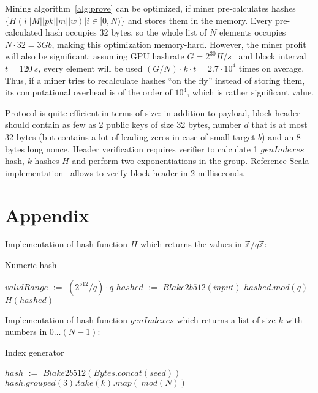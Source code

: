 \documentclass[]{article}
\def\Let#1#2{\State #1 $:=$ #2}
\begin{document}
    Mining algorithm~\ref{alg:prove} can be optimized, if miner pre-calculates
    hashes\newline $\{H(i||M||pk||m||w)|i \in [0,N)\}$ and stores them in the memory.
    Every pre-calculated hash occupies 32 bytes, so the whole list of $N$ elements
    occupies $N \cdot 32 = 3 Gb$, making this optimization memory-hard.
    However, the miner profit will also be significant: assuming GPU hashrate
    $G = 2^{30} H/s$~\cite{gpuHashrate} and block interval $t=120~s$, every element
    will be used $(G / N) \cdot k \cdot t = 2.7 \cdot 10^4$ times on average.
    Thus, if a miner tries to 
    recalculate hashes ``on the fly'' instead of storing them, its computational
    overhead is of the order of $10^4$, which is rather significant value.

    Protocol is quite efficient in terms of size: in addition to payload, block header should
    contain as few as 2 public keys of size 32 bytes, number $d$ that is at most 32 bytes
    (but contains a lot of leading zeros in case of small target $b$) and an
    8-bytes long nonce. Header verification requires verifier to calculate 1 $genIndexes$
    hash, $k$ hashes $H$ and perform two exponentiations in the group. Reference
    Scala implementation~\cite{ergoGit} allows to verify block header in 2 milliseconds.

    

    \section*{Appendix}
    \label{appendix}

    Implementation of hash function $H$ which returns the values in $\mathbb{Z}/q\mathbb{Z}$:

    \begin{algorithm}[H]
        \caption{Numeric hash}
        \label{alg:H}
        \begin{algorithmic}[1]
            \Let{$validRange$}{$(2^{512} / q) \cdot q$}
            \Let{$hashed$}{$Blake2b512(input)$}
            \State \Return $hashed.mod(q)$
            \Else
            \State \Return $H(hashed)$
            \EndIf
            \EndFunction
        \end{algorithmic}
    \end{algorithm}

    Implementation of hash function $genIndexes$ which returns a list of size $k$ with numbers in $0\dots (N-1)$:

    \begin{algorithm}[H]
        \caption{Index generator}
        \label{alg:genIndexes}
        \begin{algorithmic}[1]
            \Let{$hash$}{$Blake2b512(Bytes.concat(seed))$}
            \State \Return $hash.grouped(3).take(k).map(_.mod(N))$
            \EndFunction
        \end{algorithmic}
    \end{algorithm}
\end{document}
